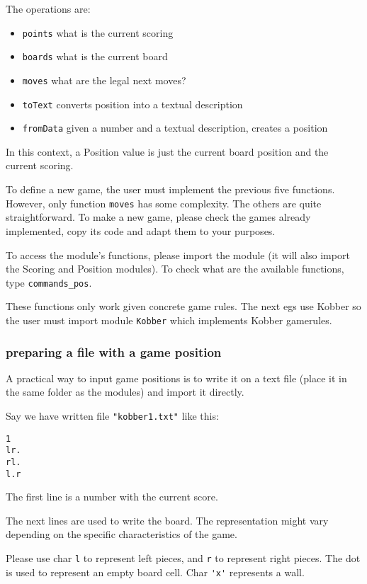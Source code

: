 \documentclass[a4paper,12pt]{article}
\begin{document}
The operations are:

\begin{itemize} \setlength\itemsep{0.1em}
  \item \verb|points| what is the current scoring
  \item \verb|boards| what is the current board
  \item \verb|moves| what are the legal next moves?
  \item \verb|toText| converts position into a textual description
  \item \verb|fromData| given a number and a textual description, creates a position
\end{itemize}

In this context, a Position value is just the current board position and the current scoring.

To define a new game, the user must implement the previous five functions. However, only function
\verb!moves! has some complexity. The others are quite straightforward. To make a new game, please check the games
already implemented, copy its code and adapt them to your purposes.

To access the module's functions, please import the module (it will also import the Scoring and Position modules). To check what are the available functions, type \verb!commands_pos!.

These functions only work given concrete game rules. The next egs use Kobber so the user 
must import module \verb!Kobber! which implements Kobber gamerules.

\subsubsection{preparing a file with a game position}

A practical way to input game positions is to write it on a text file (place it in the same folder
as the modules) and import it directly.

Say we have written file \verb|"kobber1.txt"| like this:

\begin{verbatim}
1
lr.
rl.
l.r
\end{verbatim}

The first line is a number with the current score.

The next lines are used to write the board. The representation might vary depending on the 
specific characteristics of the game.

Please use char \verb!l! to represent left pieces, and \verb!r! to represent right 
pieces. The dot is used to represent an empty board cell. Char \verb!'x'! represents a wall.
\end{document}
